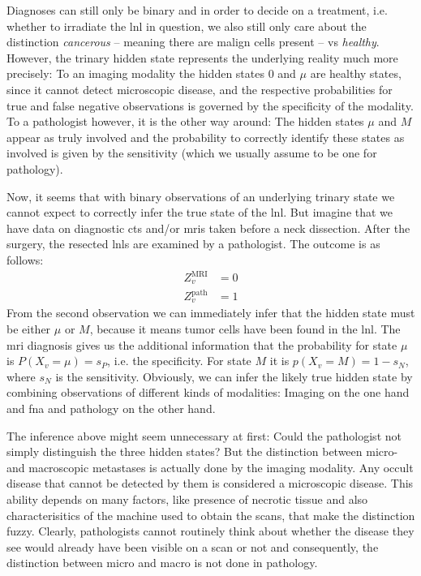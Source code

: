 \documentclass[\relativeRoot/main.tex]{subfiles}
\begin{document}
Diagnoses can still only be binary and in order to decide on a treatment, i.e. whether to irradiate the \gls{lnl} in question, we also still only care about the distinction \emph{cancerous} -- meaning there are malign cells present -- vs \emph{healthy}. However, the trinary hidden state represents the underlying reality much more precisely: To an imaging modality the hidden states $0$ and $\mu$ are healthy states, since it cannot detect microscopic disease, and the respective probabilities for true and false negative observations is governed by the specificity of the modality. To a pathologist however, it is the other way around: The hidden states $\mu$ and $M$ appear as truly involved and the probability to correctly identify these states as involved is given by the sensitivity (which we usually assume to be one for pathology).

Now, it seems that with binary observations of an underlying trinary state we cannot expect to correctly infer the true state of the \gls{lnl}. But imagine that we have data on diagnostic \glspl{ct} and/or \glspl{mri} taken before a neck dissection. After the surgery, the resected \glspl{lnl} are examined by a pathologist. The outcome is as follows:
%
\begin{equation}
    \begin{aligned}
        Z_v^\text{MRI} &= 0 \\
        Z_v^\text{path} &= 1
    \end{aligned}
\end{equation}
%
From the second observation we can immediately infer that the hidden state must be either $\mu$ or $M$, because it means tumor cells have been found in the \gls{lnl}. The \gls{mri} diagnosis gives us the additional information that the probability for state $\mu$ is $P(X_v = \mu) = s_P$, i.e. the specificity. For state $M$ it is $p(X_v = M) = 1 - s_N$, where $s_N$ is the sensitivity. Obviously, we can infer the likely true hidden state by combining observations of different kinds of modalities: Imaging on the one hand and \gls{fna} and pathology on the other hand.

The inference above might seem unnecessary at first: Could the pathologist not simply distinguish the three hidden states? But the distinction between micro- and macroscopic metastases is actually done by the imaging modality. Any occult disease that cannot be detected by them is considered a microscopic disease. This ability depends on many factors, like presence of necrotic tissue and also characterisitics of the machine used to obtain the scans, that make the distinction fuzzy. Clearly, pathologists cannot routinely think about whether the disease they see would already have been visible on a scan or not and consequently, the distinction between micro and macro is not done in pathology.
\end{document}
